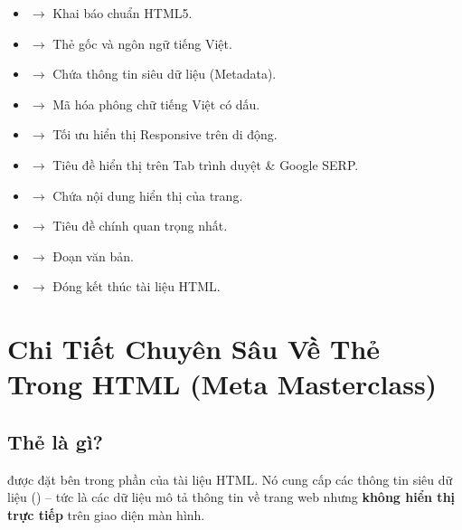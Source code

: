 \begin{noteBox}
\begin{itemize}[leftmargin=1.2em, itemsep=2pt, parsep=0pt]
    \item {} $\rightarrow$ Khai báo chuẩn HTML5.
    \item {} $\rightarrow$ Thẻ gốc và ngôn ngữ tiếng Việt.
    \item {} $\rightarrow$ Chứa thông tin siêu dữ liệu (Metadata).
    \item {} $\rightarrow$ Mã hóa phông chữ tiếng Việt có dấu.
    \item {} $\rightarrow$ Tối ưu hiển thị Responsive trên di động.
    \item {} $\rightarrow$ Tiêu đề hiển thị trên Tab trình duyệt \& Google SERP.
    \item {} $\rightarrow$ Chứa nội dung hiển thị của trang.
    \item {} $\rightarrow$ Tiêu đề chính quan trọng nhất.
    \item {} $\rightarrow$ Đoạn văn bản.
    \item {} $\rightarrow$ Đóng kết thúc tài liệu HTML.
\end{itemize}
\end{noteBox}

\section{Chi Tiết Chuyên Sâu Về Thẻ  Trong HTML (Meta Masterclass)}
\label{sec:meta_tags_masterclass}

\subsection{Thẻ  là gì?}

 được đặt bên trong phần  của tài liệu HTML. Nó cung cấp các thông tin siêu dữ liệu () -- tức là các dữ liệu mô tả thông tin về trang web nhưng \textbf{không hiển thị trực tiếp} trên giao diện màn hình.

